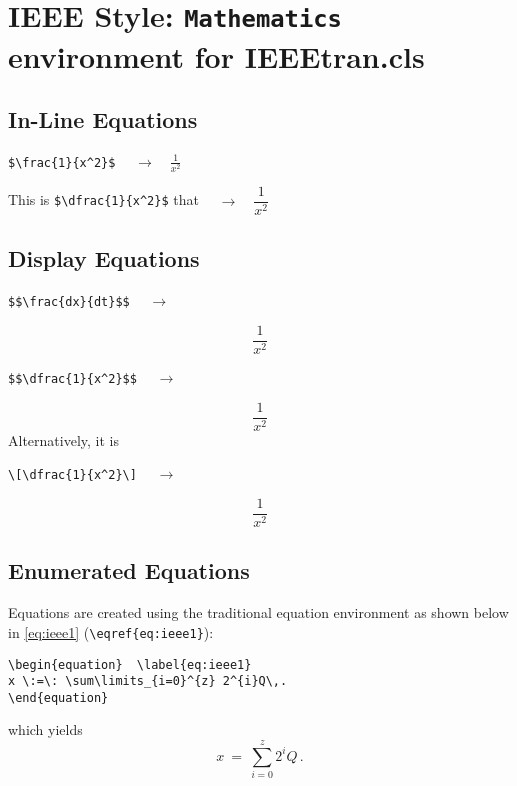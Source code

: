 \newpage
\newcommand{\TO}{$\quad\to\quad$}
\section{IEEE Style: \texttt{Mathematics} environment for IEEEtran.cls}
\raggedright{}
%
\subsection{In-Line Equations}
\begin{center} \verb!$\frac{1}{x^2}$! \TO $\frac{1}{x^2}$\par
This is \verb!$\dfrac{1}{x^2}$! that \TO $\dfrac{1}{x^2}$ 
\end{center}

 
\subsection{Display Equations}
\begin{center} \verb!$$\frac{dx}{dt}$$! \TO  \end{center}
$$\frac{1}{x^2}$$

\begin{center} \verb!$$\dfrac{1}{x^2}$$! \TO  \end{center}
$$\dfrac{1}{x^2}$$
Alternatively, it is
\begin{center} \verb!\[\dfrac{1}{x^2}\]! \TO  \end{center}
\[\dfrac{1}{x^2}\]
%
%
\subsection{Enumerated Equations}
Equations are created using the traditional equation environment as shown below in \eqref{eq:ieee1} (\verb!\eqref{eq:ieee1}!):
%
\begin{verbatim}
\begin{equation}  \label{eq:ieee1}
x \:=\: \sum\limits_{i=0}^{z} 2^{i}Q\,.
\end{equation}
\end{verbatim}
%
which yields
%
\begin{equation}  \label{eq:ieee1}
x\:=\: \sum\limits_{i=0}^{z} 2^{i}Q\,.
\end{equation}
%
%
